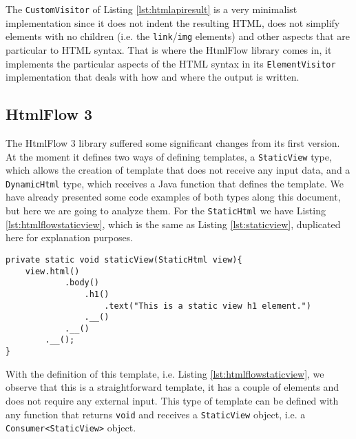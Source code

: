 \noindent
The \texttt{CustomVisitor} of Listing \ref{lst:htmlapiresult} is a very minimalist implementation since it does not indent the resulting \ac{HTML}, does not simplify elements with no children (i.e. the \texttt{link}/\texttt{img} elements) and other aspects that are particular to \ac{HTML} syntax. That is where the HtmlFlow library comes in, it implements the particular aspects of the \ac{HTML} syntax in its \texttt{ElementVisitor} implementation that deals with how and where the output is written.

\subsection{HtmlFlow 3}
\label{sec:htmlflow3}

The HtmlFlow 3 library suffered some significant changes from its first version. At the moment it defines two ways of defining templates, a \texttt{StaticView} type, which allows the creation of template that does not receive any input data, and a \texttt{DynamicHtml} type, which receives a Java function that defines the template. We have already presented some code examples of both types along this document, but here we are going to analyze them. For the \texttt{StaticHtml} we have Listing \ref{lst:htmlflowstaticview}, which is the same as Listing \ref{lst:staticview}, duplicated here for explanation purposes.

\bigskip


\begin{minipage}{\linewidth}
\begin{lstlisting}[caption={HtmlFlow - Static View Example}, label={lst:htmlflowstaticview}]
private static void staticView(StaticHtml view){
    view.html()
            .body()
                .h1()
                    .text("This is a static view h1 element.")
                .__()
            .__()
        .__();
}
\end{lstlisting}
\end{minipage} 

\noindent
With the definition of this template, i.e. Listing \ref{lst:htmlflowstaticview}, we observe that this is a straightforward template, it has a couple of elements and does not require any external input. This type of template can be defined with any function that returns \texttt{void} and receives a \texttt{StaticView} object, i.e. a \texttt{Consumer<StaticView>} object.

